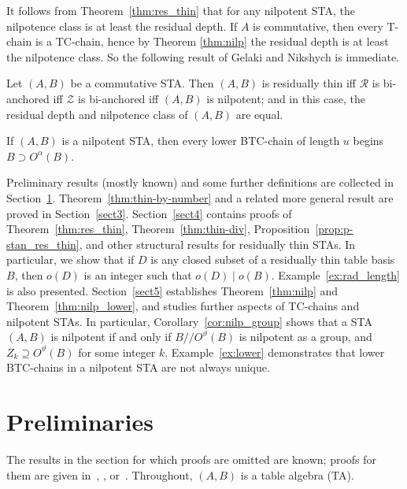  
It follows from Theorem~\ref{thm:res_thin} that for any nilpotent STA,
the nilpotence class is at least the residual depth. If $A$ is
commutative, then every T-chain is a TC-chain, hence by Theorem
\ref{thm:nilp} the residual depth
is at least the nilpotence class. So the following result of Gelaki and
Nikshych is immediate.

\begin{coro}
\label{cor:class_v_depth} 
\cite [Theorem~4.16]{GN} Let $(A, B)$ be a commutative STA. Then $(A,
B)$ is residually thin iff $\mathcal{R}$ is bi-anchored iff
$\mathcal{Z}$ is bi-anchored iff $(A, B)$ is nilpotent; and in this
case, the residual depth and nilpotence class of $(A, B)$ are equal.
\end{coro}

\begin{thm}
\label{thm:nilp_lower}
If $(A, B)$ is a nilpotent STA, then every lower BTC-chain of length $u$
begins $B \supset O^{\alpha}(B)$.
\end{thm}



Preliminary results (mostly known) and some further definitions are
collected in Section~\ref{sect2}. Theorem~\ref{thm:thin-by-number} and a related
more general result are proved in Section~\ref{sect3}. Section~\ref{sect4} contains proofs of Theorem~\ref{thm:res_thin}, Theorem~\ref{thm:thin-div},
Proposition~\ref{prop:p-stan_res_thin}, and other
structural results for residually thin STAs. 
 In particular, we
show that if $D$ is any closed subset of a residually thin table basis
$B$, then $o(D)$ is an integer such that $o(D) \mid o(B)$. Example~\ref{ex:rad_length} is also presented.
Section~\ref{sect5} establishes Theorem~\ref{thm:nilp} and Theorem~\ref{thm:nilp_lower}, and studies further aspects of TC-chains and nilpotent STAs. In particular, Corollary~\ref{cor:nilp_group} 
shows that a STA $(A, B)$ is nilpotent if and only if
$B//O^{\vartheta}(B)$ is nilpotent as a group, and $Z_k \supseteq
O^{\vartheta}(B)$ for some integer $k$. Example~\ref{ex:lower}
demonstrates 
that lower BTC-chains in a nilpotent STA are not always
unique. 



\section{Preliminaries}\label{sect2}
The results in the section for which proofs are omitted are known;
proofs for them are given 
in~\cite{AFM}, \cite{BZ}, or~\cite{Blau2}. Throughout,
$(A, B)$ is a table algebra (TA).



